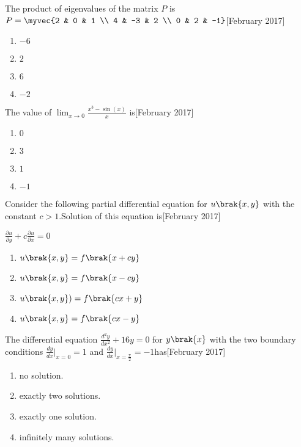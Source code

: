 \iffalse
\chapter{2017}
\author{EE24BTECH11013}
\section{me}
\fi
\item The product of eigenvalues of the matrix $P$ is \\
$P = \myvec {2 & 0 & 1 \\ 4 & -3 & 2 \\ 0 & 2 & -1} $\hfill[February 2017]
\begin{enumerate}
    \item $-6$
    \item $2$
    \item $6$
    \item $-2$
\end{enumerate}
\item The value of $ \lim_{x \to 0} \frac{x^3 - \sin(x)}{x} $ is\hfill[February 2017]
\begin{enumerate}
    \item $0$
    \item $3$
    \item $1$
    \item $-1$
\end{enumerate}
\item Consider the following partial differential equation for  $u\brak{x, y}$ with the \\ constant $c > 1$.Solution of this equation is\hfill[February 2017]
\begin{center}
$\frac{\partial u}{\partial y} + c \frac{\partial u}{\partial x} = 0$
\end{center}
\begin{enumerate}
    \item$ u\brak{x, y}= f\brak{x + cy}$
    \item$ u\brak{x, y} = f\brak{x - cy} $
    \item$ u\brak{x, y}) = f\brak{cx + y} $
    \item$ u\brak{x, y} = f\brak{cx - y} $
\end{enumerate}
\item The differential equation $ \frac{d^2 y}{dx^2} + 16y = 0 $ for $y\brak{x}$ with the two boundary conditions $\frac{dy}{dx}|_{x=0} = 1 $ and $\frac{dy}{dx}|_{x=\frac{\pi}{2}} = -1 $has\hfill[February 2017]
\begin{enumerate}
    \item no solution.
    \item exactly two solutions.
    \item exactly one solution.
    \item infinitely many solutions.
\end{enumerate}
